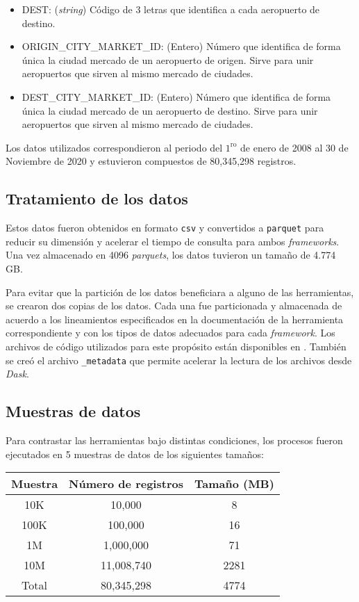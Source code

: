 \begin{itemize}
	\item DEST: (\textit{string}) Código de 3 letras que identifica a cada aeropuerto de destino.
	\item ORIGIN\_CITY\_MARKET\_ID: (Entero) Número que identifica de forma única la ciudad mercado de un aeropuerto de origen. Sirve para unir aeropuertos que sirven al mismo mercado de ciudades.
	\item DEST\_CITY\_MARKET\_ID: (Entero) Número que identifica de forma única la ciudad mercado de un aeropuerto de destino. Sirve para unir aeropuertos que sirven al mismo mercado de ciudades.
\end{itemize}

Los datos utilizados correspondieron al periodo del $1^\text{ro}$ de enero de 2008 al 30 de Noviembre de 2020 y estuvieron compuestos de 80,345,298 registros.

\subsection{Tratamiento de los datos}

Estos datos fueron obtenidos en formato \texttt{csv} y convertidos a \texttt{parquet} para reducir su dimensión y acelerar el tiempo de consulta para ambos \textit{frameworks}. Una vez almacenado en 4096 \textit{parquets}, los datos tuvieron un tamaño de 4.774 GB.

Para evitar que la partición de los datos beneficiara a alguno de las herramientas, se crearon dos copias de los datos. Cada una fue particionada y almacenada de acuerdo a los lineamientos especificados en la documentación de la herramienta correspondiente y con los tipos de datos adecuados para cada \textit{framework}. Los archivos de código utilizados para este propósito están disponibles en \cite{tratamiento-datos}. También se creó el archivo \texttt{\_metadata} que permite acelerar la lectura de los archivos desde \textit{Dask}.

\subsection{Muestras de datos}

Para contrastar las herramientas bajo distintas condiciones, los procesos fueron ejecutados en 5 muestras de datos de los siguientes tamaños:\\

\begin{center}
\begin{tabular}{|ccc|}
  \hline
 Muestra & Número de registros & Tamaño (MB) \\ 
  \hline
  10K & 10,000 & 8 \\ 
  100K & 100,000 & 16 \\ 
  1M & 1,000,000 & 71 \\ 
  10M & 11,008,740 & 2281 \\ 
  Total & 80,345,298 & 4774 \\ 
   \hline
\end{tabular}
\end{center}

